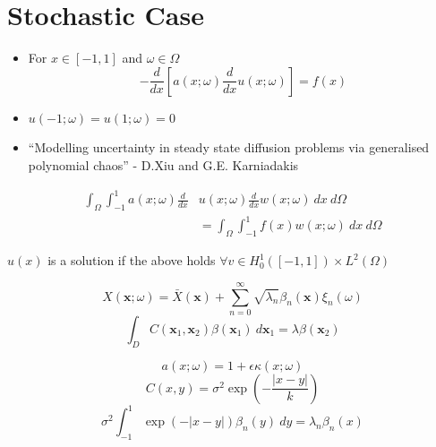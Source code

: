 \documentclass{beamer}
\begin{document}
\section{Stochastic Case}
\begin{frame}
    \begin{itemize}
        \item For $x \in [-1,1]$ and $\omega \in \Omega$
            $$-\frac{d}{dx}\left[a(x;\omega)\frac{d}{dx}u(x;\omega)\right] = f(x)$$
        \item $u(-1;\omega) = u(1;\omega) = 0$
    \end{itemize}

    \pause

    \begin{itemize}
        \item ``Modelling uncertainty in steady state diffusion problems via
                generalised polynomial chaos'' - D.Xiu and G.E. Karniadakis
    \end{itemize}

\end{frame}

\begin{frame}
    \begin{align*}
        \int_\Omega\int_{-1}^1a(x;\omega)\frac{d}{dx}&u(x;\omega)\frac{d}{dx}w(x;\omega)\
        dx\ d\Omega \\ &= \int_\Omega\int_{-1}^1f(x)w(x;\omega)\ dx\ d\Omega
    \end{align*}

    $u(x)$ is a solution if the above holds $\forall v \in H_0^1([-1,1])\times
    L^2(\Omega)$
\end{frame}

\begin{frame}
    \[
        X(\mathbf{x};\omega) = \bar{X}(\mathbf{x})
         + \sum_{n=0}^\infty\sqrt{\lambda_n}\beta_n(\mathbf{x})\xi_n(\omega)
    \]
    \pause
    \[
        \int_DC(\mathbf{x}_1, \mathbf{x}_2)\beta(\mathbf{x}_1)\ d\mathbf{x}_1
            = \lambda\beta(\mathbf{x}_2)
    \]
\end{frame}

\begin{frame}
    \[
        a(x;\omega) = 1 + \epsilon\kappa(x;\omega)
    \]
    \pause
    \[
        C(x,y) = \sigma^2\exp\left(-\frac{|x - y|}{k}\right)
    \]
    \pause
    \[
        \sigma^2\int_{-1}^1\exp(-|x - y|)\beta_n(y)\ dy = \lambda_n\beta_n(x)
    \]
\end{frame}
\end{document}
